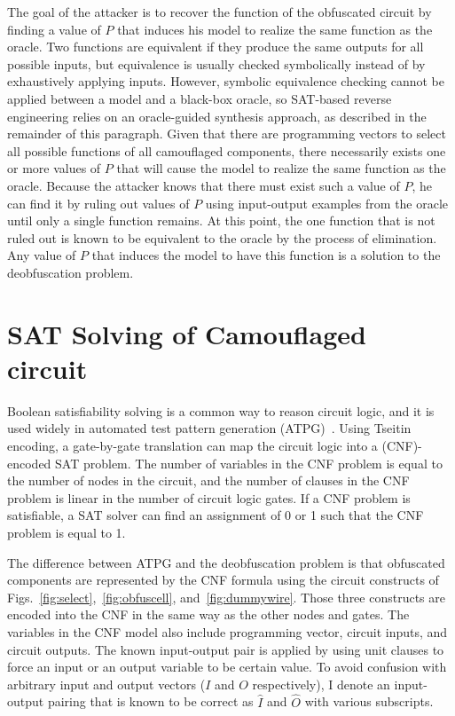 \documentclass[thesis]{umassthesis}  %
\begin{document}
The goal of the attacker is to recover the function of the obfuscated circuit by finding a value of $P$ that induces his model to realize the same function as the oracle. Two functions are equivalent if they produce the same outputs for all possible inputs, but equivalence is usually checked symbolically instead of by exhaustively applying inputs. However, symbolic equivalence checking cannot be applied between a model and a black-box oracle, so SAT-based reverse engineering relies on an oracle-guided synthesis approach, as described in the remainder of this paragraph. Given that there are programming vectors to select all possible functions of all camouflaged components, there necessarily exists one or more values of $P$ that will cause the model to realize the same function as the oracle. Because the attacker knows that there must exist such a value of $P$, he can find it by ruling out values of $P$ using input-output examples from the oracle until only a single function remains. At this point, the one function that is not ruled out is known to be equivalent to the oracle by the process of elimination. Any value of $P$ that induces the model to have this function is a solution to the deobfuscation problem.

















\section{SAT Solving of Camouflaged circuit}

Boolean satisfiability solving is a common way to reason circuit logic, and it is used widely in automated test pattern generation (ATPG)~\cite{larrabee-92}. Using Tseitin encoding, a gate-by-gate translation can map the circuit logic into a (CNF)-encoded SAT problem. The number of variables in the CNF problem is equal to the number of nodes in the circuit, and the number of clauses in the CNF problem is linear in the number of circuit logic gates. If a CNF problem is satisfiable, a SAT solver can find an assignment of 0 or 1 such that the CNF problem is equal to 1.

The difference between ATPG and the deobfuscation problem is that obfuscated components are represented by the CNF formula using the circuit constructs of Figs.~\ref{fig:select},~\ref{fig:obfuscell}, and~\ref{fig:dummywire}. Those three constructs are encoded into the CNF in the same way as the other nodes and gates. The variables in the CNF model also include programming vector, circuit inputs, and circuit outputs. The known input-output pair is applied by using unit clauses to force an input or an output variable to be certain value. To avoid confusion {with arbitrary input and output vectors ($I$ and $O$ respectively)}, I denote an input-output pairing that is known to be correct as $\widehat{I}$ and $\widehat{O}$ with various subscripts. 
\end{document}
